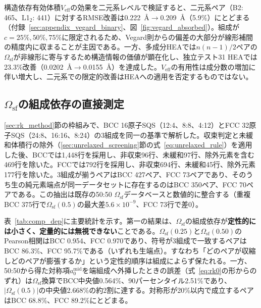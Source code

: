 \documentclass[5p,10pt]{elsarticle}
\begin{document}
構造依存有効体積$V_\text{eff}$の効果を二元系レベルで検証すると、二元系ペア（B2: 465、L1$_2$: 441）に対するRMSE改善は0.222~\AA{}$\to$0.209~\AA（5.9\%）にとどまる（付録~\ref{sec:appendix_vegard_binary}、図~\ref{fig:vegard_absorbed}）。組成が$c = 25\%, 50\%, 75\%$に限定されるため、Vegard則からの偏差の大部分が線形補間の精度内に収まることが主因である。一方、多成分HEAでは$n(n-1)/2$ペアの$\Omega_\text{sf}$が非線形に寄与するため構造情報の価値が顕在化し、独立テスト31 HEAでは23.3\%改善（0.0202~\AA{}$\to$0.0155~\AA）を達成した。$V_\text{eff}$の有用性は成分数の増加に伴い増大し、二元系での限定的改善はHEAへの適用を否定するものではない。


\subsection{$\Omega_\text{sf}$の組成依存の直接測定}
\label{sec:comp_dep}

\ref{sec:rk_method}節の枠組みで、BCC 16原子SQS（12:4、8:8、4:12）とFCC 32原子SQS（24:8、16:16、8:24）の3組成を同一の基準で解析した。収束判定と未緩和体積行の除外（\ref{sec:unrelaxed_screening}節の式~\eqref{eq:unrelaxed_rule}）を適用した後、BCCでは1,448行を採用し、非収束96行、未緩和97行、除外元素を含む469行を除いた。FCCでは792行を採用し、非収束694行、未緩和45行、除外元素177行を除いた。3組成が揃うペアはBCC 427ペア、FCC 73ペアであり、そのうち生の純元素端点が同一データセットに存在するのはBCC 350ペア、FCC 70ペアである。この抽出は既存の50:50 $\Omega_\text{sf}$データベースと数値的に整合する（重複BCC 375行で$\Omega_\text{sf}(0.5)$の最大差$5.6\times10^{-9}$、FCC 73行で差0）。

表~\ref{tab:comp_dep}に主要統計を示す。第一の結果は、$\Omega_\text{sf}$の組成依存が\textbf{定性的には小さく、定量的には無視できない}ことである。$\Omega_\text{sf}(0.25)$と$\Omega_\text{sf}(0.50)$のPearson相関はBCC 0.954、FCC 0.970であり、符号が3組成で一致するペアはBCC 86.3\%、FCC 95.7\%である（いずれも生端点）。すなわち「どのペアが収縮しどのペアが膨張するか」という定性的順序は組成によらず保たれる。一方、50:50から得た対称項$a_0^\text{mid}$を端組成へ外挿したときの誤差（式~\eqref{eq:rk0}の形からのずれ）は$\Omega_\text{sf}$換算でBCC中央値0.564\%、90パーセンタイル2.51\%であり、$|\Omega_\text{sf}(0.5)|$の中央値2.668\%の約2割に達する。対称形が20\%以内で成立するペアはBCC 68.8\%、FCC 89.2\%にとどまる。
\end{document}

